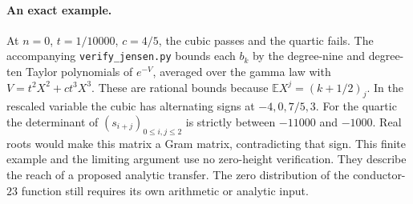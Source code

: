 \paragraph{An exact example.}
At $n=0$, $t=1/10000$, $c=4/5$, the cubic passes and the quartic fails.
The accompanying \texttt{verify\_jensen.py} bounds each $b_k$ by the
degree-nine and degree-ten Taylor polynomials of $e^{-V}$, averaged over
the gamma law with $V=t^2X^2+ct^3X^3$. These are rational bounds because
$\mathbb E X^j=(k+1/2)_j$. In the rescaled variable the cubic has
alternating signs at $-4,0,7/5,3$. For the quartic the determinant
of $(s_{i+j})_{0\le i,j\le2}$ is strictly between $-11000$ and $-1000$.
Real roots would make this matrix a Gram matrix, contradicting that sign.
This finite example and the limiting argument use no zero-height verification.
They describe the reach of a proposed analytic transfer. The zero
distribution of the conductor-$23$ function still requires its own
arithmetic or analytic input.
